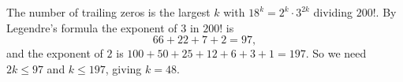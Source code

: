 The number of trailing zeros is the largest $k$ with $18^k=2^k\cdot3^{2k}$ dividing $200!$. By Legendre's formula the exponent of $3$ in $200!$ is
\[66+22+7+2=97,\]
and the exponent of $2$ is $100+50+25+12+6+3+1=197$. So we need $2k\le97$ and $k\le197$, giving $k=\boxed{48}$.
